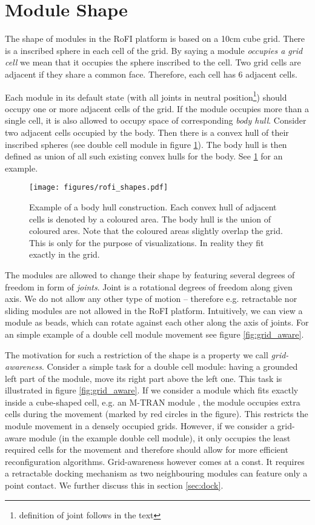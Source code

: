 \section{Module Shape}\label{sec:aware}

The shape of modules in the RoFI platform is based on a 10cm cube grid. There is
a inscribed sphere in each cell of the grid. By saying a module \emph{occupies a
grid cell} we mean that it occupies the sphere inscribed to the cell. Two grid
cells are adjacent if they share a common face. Therefore, each cell has 6
adjacent cells.

Each module in its default state (with all joints in neutral
position\footnote{definition of joint follows in the text}) should occupy one or
more adjacent cells of the grid. If the module occupies more than a single cell,
it is also allowed to occupy space of corresponding \emph{body hull}. Consider
two adjacent cells occupied by the body. Then there is a convex hull of their
inscribed spheres (see double cell module in figure \ref{fig:rofi_shapes}). The
body hull is then defined as union of all such existing convex hulls for the
body. See \ref{fig:rofi_shapes} for an example.

\begin{figure}
    \centering
    \texttt{[image: figures/rofi\_shapes.pdf]}
    \caption{Example of a body hull construction. Each convex hull of adjacent
    cells is denoted by a coloured area. The body hull is the union of coloured
    ares. Note that the coloured areas slightly overlap the grid. This is only
    for the purpose of visualizations. In reality they fit exactly in the grid.}
    \label{fig:rofi_shapes}
\end{figure}

The modules are allowed to change their shape by featuring several degrees of
freedom in form of \emph{joints}. Joint is a rotational degrees of freedom along
given axis. We do not allow any other type of motion -- therefore e.g.
retractable nor sliding modules are not allowed in the RoFI platform.
Intuitively, we can view a module as beads, which can rotate against each other
along the axis of joints. For an simple example of a double cell module movement
see figure \ref{fig:grid_aware}.

The motivation for such a restriction of the shape is a property we call
\emph{grid-awareness}. Consider a simple task for a double cell module: having a
grounded left part of the module, move its right part above the left one. This
task is illustrated in figure \ref{fig:grid_aware}. If we consider a module
which fits exactly inside a cube-shaped cell, e.g. an M-TRAN module
\cite{haruhisa_kurokawa_m-tran_2003}, the module occupies extra cells during the
movement (marked by red circles in the figure). This restricts the module
movement in a densely occupied grids. However, if we consider a grid-aware
module (in the example double cell module), it only occupies the least required
cells for the movement and therefore should allow for more efficient
reconfiguration algorithms. Grid-awareness however comes at a const. It requires
a retractable docking mechanism as two neighbouring modules can feature only a
point contact. We further discuss this in section \ref{sec:dock}.


